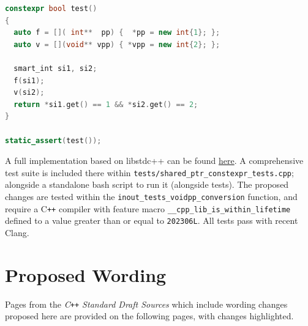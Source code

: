 \documentclass[10pt]{article}
\newcommand*{\upstreamcommit}{05300d7}
\newcommand*{\forkcommit}{fb46090}
\newcommand*{\Cpp}{C\texttt{++}}
\begin{document}
\begin{lstlisting}[language=cpp]
constexpr bool test()
{
  auto f = []( int**  pp) {  *pp = new int{1}; };
  auto v = [](void** vpp) { *vpp = new int{2}; };

  smart_int si1, si2;
  f(si1);
  v(si2);
  return *si1.get() == 1 && *si2.get() == 2;
}

static_assert(test());
\end{lstlisting}

A full implementation
based on libstdc++ can be found
\href{https://github.com/SCT4SP/constexpr_shared_ptr/tree/smartptr-adapt}{here}.
A comprehensive test suite is included there within
\texttt{tests/shared\_ptr\_constexpr\_tests.cpp}; alongside a standalone bash
script to run it (alongside \cite{P3037R6} tests). The proposed changes are
tested within the \texttt{inout\_tests\_voidpp\_conversion} function, and
require a \Cpp{} compiler with feature macro
\texttt{\_\_cpp\_lib\_is\_within\_lifetime} defined to a value greater than or
equal to \texttt{202306L}. All tests pass with recent Clang.


\section{Proposed Wording}
\label{sec:wording}



Pages from the \emph{\Cpp{} Standard Draft Sources} which include wording
changes proposed here are
provided on the following pages, with changes highlighted.



\end{document}
